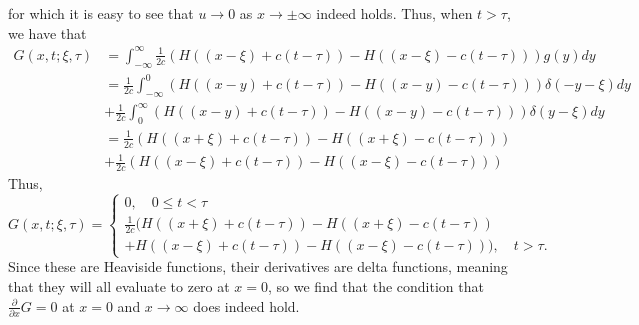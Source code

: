 \documentclass{article}
\begin{document}
for which it is easy to see that $u\to0$ as $x\to\pm\infty$ indeed holds. Thus, when $t>\tau$, we have that 
\begin{align*}
	G(x,t;\xi,\tau)&=\int_{-\infty}^\infty\frac{1}{2c}\left(H((x-\xi)+c(t-\tau))-H((x-\xi)-c(t-\tau))\right)g(y)dy\\&=
	\frac{1}{2c}\int_{-\infty}^0\left(H((x-y)+c(t-\tau))-H((x-y)-c(t-\tau))\right)\delta(-y-\xi)dy\\&+\frac{1}{2c}\int_{0}^\infty \left(H((x-y)+c(t-\tau))-H((x-y)-c(t-\tau))\right)\delta(y-\xi)dy\\&=
	\frac{1}{2c}\left(H((x+\xi)+c(t-\tau))-H((x+\xi)-c(t-\tau))\right)\\&+\frac{1}{2c} \left(H((x-\xi)+c(t-\tau))-H((x-\xi)-c(t-\tau))\right)
\end{align*}
Thus,
\[
G(x,t;\xi,\tau)=\begin{cases}
	0, \quad 0\leq t<\tau\\
	\frac{1}{2c}(H((x+\xi)+c(t-\tau))-H((x+\xi)-c(t-\tau))\\+H((x-\xi)+c(t-\tau))-H((x-\xi)-c(t-\tau))), \quad t>\tau.
\end{cases}
\]
Since these are Heaviside functions, their derivatives are delta functions, meaning that they will all evaluate to zero at $x=0$, so we find that the condition that $\frac{\partial}{\partial x}G=0$ at $x=0$ and $x\to\infty$ does indeed hold.
\end{document}
